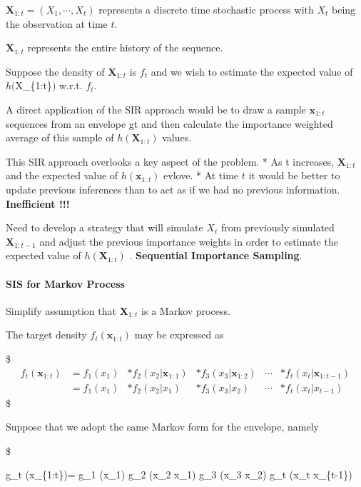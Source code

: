 \documentclass[
]{book}
\begin{document}
\(\pmb X_{1:t} = (X_1 , \cdots, X_t )\) represents a discrete time stochastic process with \(X_t\) being the observation at time \(t\).

\(\pmb X_{1:t}\) represents the entire history of the sequence.

Suppose the density of \(\pmb X_{1:t}\) is \(f_t\) and we wish to estimate the expected value of \(h(\)\pmb X\_\{1:t\}\()\) w.r.t. \(f_t\).

A direct application of the SIR approach would be to draw a sample \(\pmb x_{1:t}\) sequences from an envelope gt and then calculate the importance weighted average of this sample of \(h(\pmb X_{1:t})\) values.

This SIR approach overlooks a key aspect of the problem.
* As t increases, \(\pmb X_{1:t}\) and the expected value of \(h(\pmb x_{1:t})\) evlove.
* At time \(t\) it would be better to update previous inferences than to act as if we had no previous information. \textbf{Inefficient !!!}

Need to develop a strategy that will simulate \(X_t\) from previously simulated \(\pmb X_{1:t-1}\) and adjust the previous importance weights in order to estimate the expected value of \(h(\pmb X_{1:t})\) . \textbf{Sequential Importance Sampling}.

\hypertarget{sis-for-markov-process}{%
\paragraph{SIS for Markov Process}\label{sis-for-markov-process}}

Simplify assumption that \(\pmb X_{1:t}\) is a Markov process.

The target density \(f_t (\pmb x_{1:t})\) may be expressed as

\$
\begin{align*}

f_t (\pmb x_{1:t}) &= f_1 (x_1) &\ast f_2 (x_2 \rvert \pmb x_{1:1}) &\ast f_3 (x_3 \rvert \pmb x_{1:2}) &\cdots &\ast f_t (x_t \rvert \pmb x_{1:t-1}) \\


&= f_1 (x_1) &\ast f_2 (x_2 \rvert x_1) &\ast f_3 (x_3 \rvert x_2) &\cdots &\ast f_t (x_t \rvert x_{t-1})

\end{align*}
\$

Suppose that we adopt the same Markov form for the envelope, namely

\$

g\_t (\pmb x\_\{1:t\})= g\_1 (x\_1) \ast g\_2 (x\_2 \rvert x\_1) \ast g\_3 (x\_3 \rvert x\_2) \cdots \ast g\_t (x\_t \rvert x\_\{t-1\})
\end{document}
